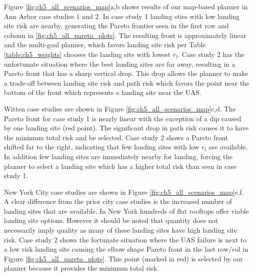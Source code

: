 Figure \ref{fig:ch5_all_scenarios_map}a,b shows results of our map-based planner in Ann Arbor case studies 1 and 2. In case study 1 landing sties with low landing site risk are nearby, generating the Pareto frontier seen in the first row and column in \ref{fig:ch5_all_pareto_plots}. The resulting front is approximately linear and the multi-goal planner, which favors landing site risk per Table \ref{table:ch5_weights} chooses the landing site with lowest $r_l$. Case study 2 has the unfortunate situation where the best landing sites are far away, resulting in a Pareto front that has a sharp vertical drop. This drop allows the planner to make a trade-off between landing site risk and path risk which favors the point near the bottom of the front which represents a landing site near the UAS.

Witten case studies are shown in Figure \ref{fig:ch5_all_scenarios_map}c,d.   The Pareto front for case study 1 is nearly linear with the exception of a dip caused by one landing site (red point). The significant drop in path risk causes it to have the minimum total risk and be selected. Case study 2 shows a Pareto front shifted far to the right, indicating that few landing sites with low $r_l$ are available. In addition few landing sites are immediately nearby for landing, forcing the planner to select a landing site which has a higher total risk than seen in case study 1.

New York City case studies are shown in Figure \ref{fig:ch5_all_scenarios_map}e,f. A clear difference from the prior city case studies is the increased number of landing sites that are available. In New York hundreds of flat rooftops offer viable landing site options. However it should be noted that quantity does not necessarily imply quality as many of these landing sites have high landing site risk. Case study 2 shows the fortunate situation where the \ac{UAS} failure is next to a low risk landing site causing the elbow shape Pareto front in the last row/col in Figure \ref{fig:ch5_all_pareto_plots}. This point (marked in red) is selected by our planner because it provides the minimum total risk.



